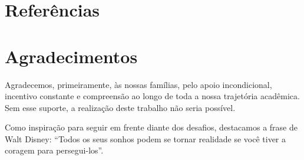 \documentclass[a4paper,10pt, twocolumn]{article}
\begin{document}






\section{Referências}
\printbibliography[heading=none]

\section{Agradecimentos}
Agradecemos, primeiramente, às nossas famílias, pelo apoio incondicional,
incentivo constante e compreensão ao longo de toda a nossa trajetória
acadêmica. Sem esse suporte, a realização deste trabalho não seria
possível.

Como inspiração para seguir em frente diante dos desafios, destacamos
a frase de Walt Disney: “Todos os seus sonhos podem se tornar realidade
se você tiver a coragem para persegui-los”.


\end{document}
